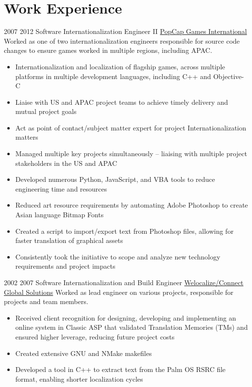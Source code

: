\documentclass[a4paper]{twentysecondcv} %
\begin{document}
\newpage
\makeprofiletwo

\section{Work Experience}
\begin{twenty}
\twentyitem
    	{2007} %
	{2012} %
    {Software Internationalization Engineer II} %
    {\href{https://www.popcap.com/}{PopCap Games International}} %
    {Worked as one of two internationalization engineers responsible for source code changes to ensure games worked in multiple regions, including APAC.} %
	{\begin{itemize}
		\item Internationalization and localization of flagship games, across multiple platforms in multiple development languages, including C++ and Objective-C
		\item Liaise with US and APAC project teams to achieve timely delivery and mutual project goals
		\item Act as point of contact/subject matter expert for project Internationalization matters
	\end{itemize}
	} %
	{\begin{itemize}
		\item Managed multiple key projects simultaneously – liaising with multiple project stakeholders in the US and APAC
		\item Developed numerous Python, JavaScript, and VBA tools to reduce engineering time and resources
		\item Reduced art resource requirements by automating Adobe Photoshop to create Asian language Bitmap Fonts
		\item Created a script to import/export text from Photoshop files, allowing for faster translation of graphical assets
		\item Consistently took the initiative to scope and analyze new technology requirements and project impacts
	\end{itemize}
	} %

\end{twenty}

\begin{twenty}
\twentyitem
    	{2002} %
	{2007} %
    {Software Internationalization and Build Engineer} %
    {\href{https://www.welocalize.com/}{Welocalize/Connect Global Solutions}} %
    {Worked as lead engineer on various projects, responsible for projects and team members.} %
	{}
	{\begin{itemize}
		\item Received client recognition for designing, developing and implementing an online system in Classic ASP that validated Translation Memories (TMs) and ensured higher leverage, reducing future project costs
		\item Created extensive GNU and NMake makefiles
		\item Developed a tool in C++ to extract text from the Palm OS RSRC file format, enabling shorter localization cycles
	 \end{itemize}
	}
\end{twenty}
\end{document}

